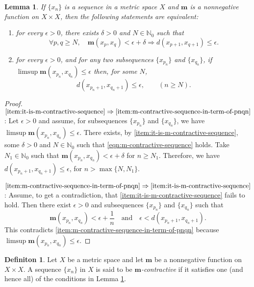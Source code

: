 \documentclass[a4paper,10pt,twoside,reqno]{amsart}
\newtheorem{lem}[thm]{Lemma}
\theoremstyle{definition}
\newtheorem{dfn}[thm]{Definiton}
\theoremstyle{remark}
\newcommand{\set}[1]{\{#1\}}
\newcommand{\de}{\delta}
\newcommand{\e}{\epsilon}
\newcommand{\N}{\mathbb{N}}
\newcommand{\m}{\mathbf{m}}
\numberwithin{equation}{section}
\begin{document}
\begin{lem}
\label{lem:equiv-conditions-m-contractive-sequence}
 If $\set{x_n}$ is a sequence in a metric space $X$ and
 $\m$ is a nonnegative function on $X\times X$, then
 the following statements are equivalent:
  \begin{enumerate}[\upshape(i)]
    \item \label{item:it-is-m-contractive-sequence}
    for every $\e>0$, there exists $\de>0$ and $N\in\N_0$ such that
    \begin{equation}\label{eqn:m-contractive-sequence}
      \forall p,q\geq N, \quad
      \m(x_p,x_q) < \e+\de \Longrightarrow d(x_{p+1},x_{q+1}) \leq \e.
    \end{equation}

    \item \label{item:m-contractive-sequence-in-term-of-pnqn}
    for every $\e>0$, and for any two subsequences $\{x_{p_n}\}$ and $\{x_{q_n}\}$,
    if \newline $\limsup \m(x_{p_n},x_{q_n})\leq \e$ then,
    for some $N$,
    \[
      d(x_{p_n+1},x_{q_n+1}) \leq \e, \qquad (n\geq N).
    \]
  \end{enumerate}
\end{lem}

\begin{proof}
 $\eqref{item:it-is-m-contractive-sequence}
 \Rightarrow \eqref{item:m-contractive-sequence-in-term-of-pnqn}$:
 Let $\e>0$ and assume, for subsequences $\{x_{p_n}\}$ and $\{x_{q_n}\}$,
 we have $\limsup \m(x_{p_n},x_{q_n})\leq \e$. There exists,
 by \eqref{item:it-is-m-contractive-sequence},
 some $\de>0$ and $N\in\N_0$ such that \eqref{eqn:m-contractive-sequence}
 holds. Take $N_1\in\N_0$ such that $\m(x_{p_n},x_{q_n}) < \e+\de$
 for $n\geq N_1$. Therefore, we have $d(x_{p_n+1},x_{q_n+1}) \leq \e$,
 for $n>\max\set{N,N_1}$.

 $\eqref{item:m-contractive-sequence-in-term-of-pnqn}
 \Rightarrow \eqref{item:it-is-m-contractive-sequence}$:
 Assume, to get a contradiction, that \eqref{item:it-is-m-contractive-sequence}
 fails to hold. Then there exist $\e>0$ and subsequences $\{x_{p_n}\}$ and $\{x_{q_n}\}$
 such that
 \[
   \m(x_{p_n},x_{q_n}) < \e+\frac1n \quad \text{and} \quad
   \e < d(x_{p_n+1},x_{q_n+1}).
 \]
 This contradicts \eqref{item:m-contractive-sequence-in-term-of-pnqn}
 because $\limsup \m(x_{p_n},x_{q_n}) \leq \e$.
\end{proof}

\begin{dfn}
\label{dfn:m-contractive-sequence}
 Let $X$ be a metric space and let $\m$ be a nonnegative function on
 $X\times X$. A sequence $\set{x_n}$ in $X$ is said to be
 \emph{$\m$-contractive} if it satisfies one (and hence all) of the conditions in
 Lemma \ref{lem:equiv-conditions-m-contractive-sequence}.
\end{dfn}
\end{document}
